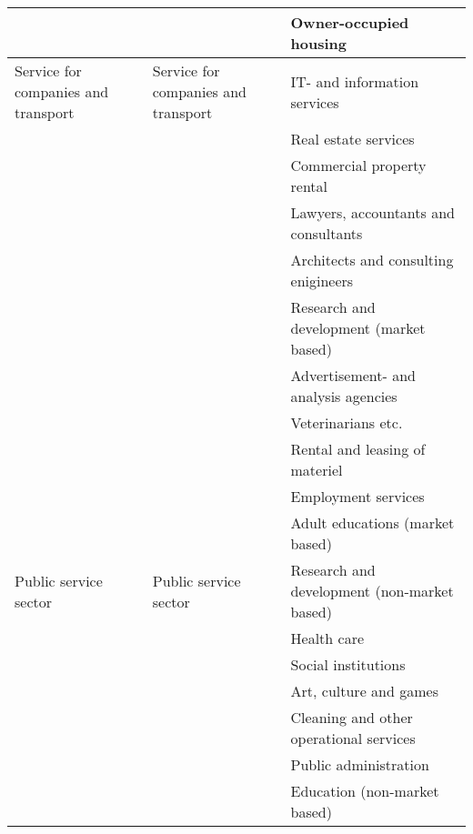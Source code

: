 \begin{table}[]
{\begin{tabular}{|l|l|l|}
 &  & Owner-occupied housing \\ \hline
\multirow{}{*}{Service for   companies and transport} & \multirow{}{*}{Service for companies and transport} & IT- and information services \\ \cline{3-3} 
 &  & Real estate services \\ \cline{3-3} 
 &  & Commercial property rental \\ \cline{3-3} 
 &  & Lawyers, accountants and consultants \\ \cline{3-3} 
 &  & Architects and consulting enigineers \\ \cline{3-3} 
 &  & Research and development (market based) \\ \cline{3-3} 
 &  & Advertisement- and analysis agencies \\ \cline{3-3} 
 &  & Veterinarians etc. \\ \cline{3-3} 
 &  & Rental and leasing of materiel \\ \cline{3-3} 
 &  & Employment services \\ \cline{3-3} 
 &  & Adult educations (market based) \\ \hline
\multirow{}{*}{Public service   sector} & \multirow{}{*}{Public service sector} & Research and development (non-market based) \\ \cline{3-3} 
 &  & Health care \\ \cline{3-3} 
 &  & Social institutions \\ \cline{3-3} 
 &  & Art, culture and games \\ \cline{3-3} 
 &  & Cleaning and other operational services \\ \cline{3-3} 
 &  & Public administration \\ \cline{3-3} 
 &  & Education (non-market based) \\ \hline
\end{tabular}%
}
\end{table}


